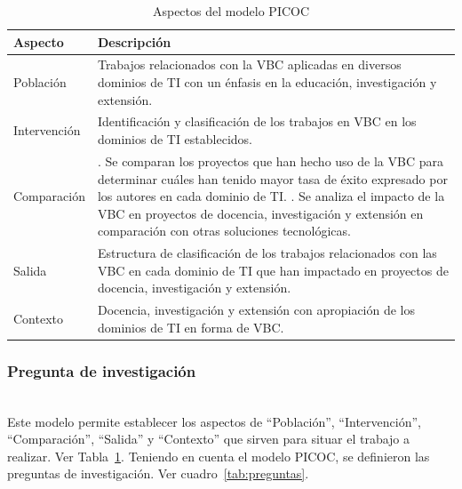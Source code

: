\begin{table}[tbp]
    \scriptsize %
    \centering
    \renewcommand{\arraystretch}{1.3}
    \begin{tabularx}{\columnwidth}{>{\centering\arraybackslash}m{} >{\RaggedRight\arraybackslash}X}
        \hline
        \textbf{Aspecto} & \textbf{Descripción} \\
        \hline
        Población & Trabajos relacionados con la VBC aplicadas en diversos dominios de TI con un énfasis en la educación, investigación y extensión. \\
        Intervención & Identificación y clasificación de los trabajos en VBC en los dominios de TI establecidos. \\
        Comparación & 
        1. Se comparan los proyectos que han hecho uso de la VBC para determinar cuáles han tenido mayor tasa de éxito expresado por los autores en cada dominio de TI. \newline
        2. Se analiza el impacto de la VBC en proyectos de docencia, investigación y extensión en comparación con otras soluciones tecnológicas. \\
        Salida & Estructura de clasificación de los trabajos relacionados con las VBC en cada dominio de TI que han impactado en proyectos de docencia, investigación y extensión. \\
        Contexto & Docencia, investigación y extensión con apropiación de los dominios de TI en forma de VBC. \\
        \hline
    \end{tabularx}
    \caption{Aspectos del modelo PICOC}
    \label{tab:PICOC}
\end{table}



\subsubsection{Pregunta de investigación}
\mbox{}\\


Este modelo permite establecer los aspectos de ``Población'', ``Intervención'', ``Comparación'', ``Salida'' y ``Contexto'' que sirven para situar el trabajo a realizar. Ver Tabla~\ref{tab:PICOC}.
Teniendo en cuenta el modelo PICOC, se definieron las preguntas de investigación. Ver cuadro~\ref{tab:preguntas}.

